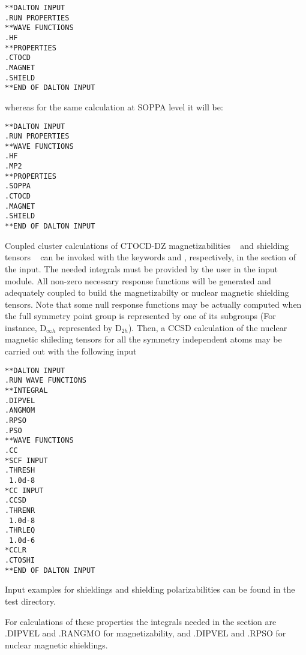 \begin{verbatim}
**DALTON INPUT
.RUN PROPERTIES
**WAVE FUNCTIONS
.HF
**PROPERTIES
.CTOCD
.MAGNET
.SHIELD
**END OF DALTON INPUT
\end{verbatim}
whereas for the same calculation at SOPPA level it will be:

\begin{verbatim}
**DALTON INPUT
.RUN PROPERTIES
**WAVE FUNCTIONS
.HF
.MP2
**PROPERTIES
.SOPPA
.CTOCD
.MAGNET
.SHIELD
**END OF DALTON INPUT
\end{verbatim}





Coupled cluster calculations of CTOCD-DZ magnetizabilities
~\cite{pccpcctocd} and shielding tensors ~\cite{spas073, pccpcctocd}
can be invoked with the keywords  and ,
respectively, in the  section of the  input. The
needed integrals must be provided by the user in the 
input module. All non-zero necessary response functions will be
generated and adequately coupled to build the magnetizabilty or nuclear
magnetic shielding tensors. Note that some null response functions may
be actually computed when the full symmetry point group is represented
by one of its subgroups (For instance, D$_{\infty h}$ represented by
D$_{2h}$). Then, a CCSD calculation of the nuclear magnetic shileding
tensors for all the symmetry independent atoms may be carried out with
the following input


\begin{verbatim}
**DALTON INPUT
.RUN WAVE FUNCTIONS
**INTEGRAL
.DIPVEL
.ANGMOM
.RPSO
.PSO
**WAVE FUNCTIONS
.CC
*SCF INPUT
.THRESH
 1.0d-8
*CC INPUT
.CCSD
.THRENR
 1.0d-8
.THRLEQ
 1.0d-6
*CCLR
.CTOSHI
**END OF DALTON INPUT
\end{verbatim}



Input examples for shieldings and shielding polarizabilities can be found in
the test directory.

For  calculations of these properties the integrals needed in
the  section are .DIPVEL and .RANGMO for magnetizability, and .DIPVEL and .RPSO for
nuclear magnetic shieldings.
